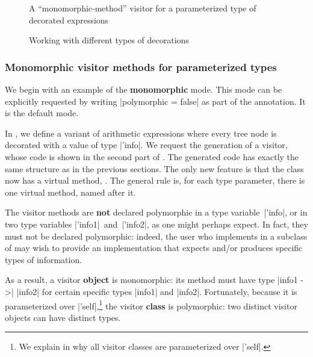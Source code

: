 \documentclass[11pt,a4paper,twoside]{article}
\renewcommand{\emph}[1]{\textbf{#1}}
\begin{document}

\begin{figure}[p]
\vspace{-\baselineskip}
\caption{A ``monomorphic-method'' visitor for a parameterized type of decorated expressions}
\label{fig:expr_info}
\end{figure}

\begin{figure}[p]
\caption{Working with different types of decorations}
\label{fig:expr_info_use}
\end{figure}

\subsubsection{Monomorphic visitor methods for parameterized types}
\label{sec:intro:parameterized:mono}

We begin with an example of the \emph{monomorphic} mode. This mode can be
explicitly requested by writing \oc|polymorphic = false| as part of the
\derivingvisitors annotation. It is the default mode.

In , we define a variant of arithmetic
expressions where every tree node is decorated with a value of type
\oc|'info|. We request the generation of a \map visitor, whose code is shown
in the second part of . The generated code has exactly the
same structure as in the previous sections. The only new feature is that the
class \map now has a virtual method, . The general rule
is, for each type parameter, there is one virtual method, named after it.

The visitor methods are \emph{not} declared polymorphic in a type
variable~\oc|'info|, or in two type variables \oc|'info1|~and~\oc|'info2|, as
one might perhaps expect. In fact, they must not be declared polymorphic:
indeed, the user who implements  in a subclass of \map may
wish to provide an implementation that expects and/or produces specific types
of information.

As a result, a visitor \emph{object} is monomorphic: its method
 must have type \oc|info1 ->| \oc|info2| for certain
specific types \oc|info1| and \oc|info2|. Fortunately, because it is
parameterized over \oc|'self|,\footnote{We explain in  why
  all visitor classes are parameterized over \oc|'self|.} the visitor
\emph{class} is polymorphic: two distinct visitor objects can have distinct
types.
\end{document}
